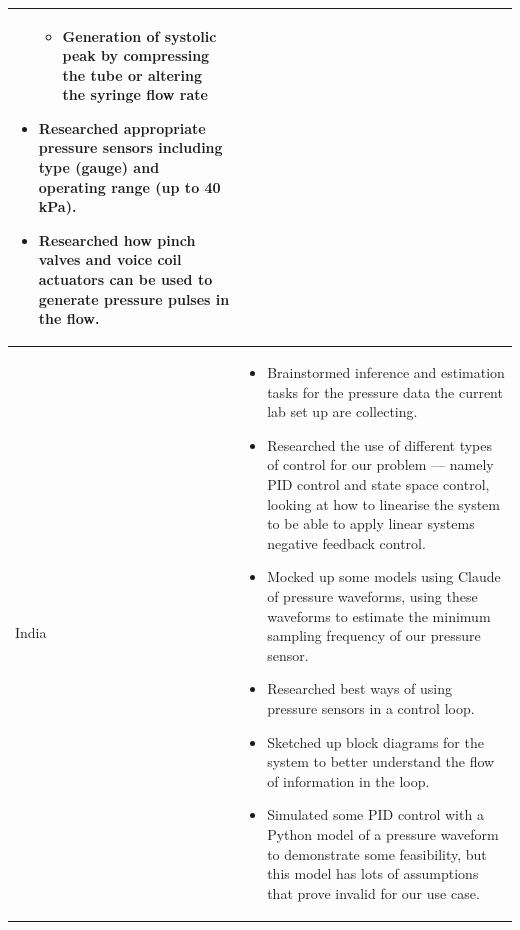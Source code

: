 \documentclass[10pt, a4paper]{article}
\begin{document}
\begin{table}[H]
\begin{tabularx}{\linewidth}{>{\raggedright\arraybackslash}p{1cm} X}
\begin{itemize}[nosep, leftmargin=*]
\begin{itemize}[nosep, leftmargin=*]
                      \item Generation of systolic peak by compressing the tube or altering the syringe flow rate
                  \end{itemize}
                            \item Researched appropriate pressure sensors including type (gauge) and operating range (up to 40\,kPa).
                            \item Researched how pinch valves and voice coil actuators can be used to generate pressure pulses in the flow.
                        \end{itemize}                                            \\
        \midrule
        India
                      & \begin{itemize}[nosep, leftmargin=*]
                            \item Brainstormed inference and estimation tasks for the pressure data the current lab set up are collecting.
                            \item Researched the use of different types of control for our problem --- namely PID control and state space control, looking at how to linearise the system to be able to apply linear systems negative feedback control.
                            \item Mocked up some models using Claude of pressure waveforms, using these waveforms to estimate the minimum sampling frequency of our pressure sensor.
                            \item Researched best ways of using pressure sensors in a control loop.
                            \item Sketched up block diagrams for the system to better understand the flow of information in the loop.
                            \item Simulated some PID control with a Python model of a pressure waveform to demonstrate some feasibility, but this model has lots of assumptions that prove invalid for our use case.
                        \end{itemize} \\

        \midrule


\end{tabularx}
\end{table}
\end{document}
